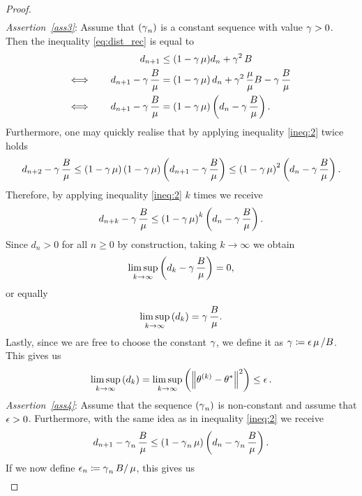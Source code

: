 \begin{proof}
\begin{align*}
\end{align*}
\textit{Assertion~\ref{ass3}}: Assume that $(\g_n)$ is a constant sequence with value $\g>0$. Then the inequality \eqref{eq:dist_rec} is equal to
\begin{align}\label{ineq:2}
d_{n+1} &\leq (1 - \g\m)d_n + \g^2B\nonumber\\
\Longleftrightarrow \qquad d_{n+1} - \g\frac{B}{\m} &= \left(1 - \g\m\right)d_n + \g^2\frac{\m}{\m} B - \g\frac{B}{\m}\nonumber\\
\Longleftrightarrow \qquad d_{n+1} - \g\frac{B}{\m} &= \left(1 - \g\m\right)\left(d_n - \g\frac{B}{\m}\right).
\end{align}
Furthermore, one may quickly realise that by applying inequality \eqref{ineq:2} twice holds
\begin{align*}
d_{n+2} - \g\frac{B}{\m} \leq \left(1 - \g\m\right)\left(1 - \g\m\right)\left(d_{n+1} - \g\frac{B}{\m}\right) \leq \left(1 - \g\m\right)^2\left(d_n - \g\frac{B}{\m}\right).
\end{align*}
Therefore, by applying inequality \eqref{ineq:2} $k$ times we receive
\begin{align*}
d_{n+k} - \g\frac{B}{\m} \leq \left(1 - \g\m\right)^k\left(d_n - \g\frac{B}{\m}\right).
\end{align*}
Since $d_n>0$ for all $n\geq 0$ by construction, taking $k\to\infty$ we obtain
\begin{align*}
\limsup_{k\to\infty} \left( d_{k} - \g\frac{B}{\m} \right) = 0,
\end{align*}
or equally
\begin{align*}
\limsup_{k\to\infty} \left( d_{k}\right) = \g\frac{B}{\m}.
\end{align*}
Lastly, since we are free to choose the constant $\g$, we define it as $\g\coloneqq \e \m/B$. This gives us
\begin{align*}
\limsup_{k\to\infty} \left( d_{k}\right) = \limsup_{k\to \infty} \left( \left\| \t^{(k)} - \t^{\ast} \right\|^2 \right) \leq \e.
\end{align*}
\textit{Assertion~\ref{ass4}}: Assume that the sequence $(\g_n)$ is non-constant and assume that $\e>0$. Furthermore, with the same idea as in inequality \eqref{ineq:2} we receive
\begin{align*}
d_{n+1} - \g_n\frac{B}{\m} \leq \left(1 - \g_n\m\right)\left(d_n - \g_n\frac{B}{\m}\right).
\end{align*}
If we now define $\e_n \coloneqq \g_nB/\m$, this gives us
\begin{align}\label{ineq:3}

\end{align}
\end{proof}

